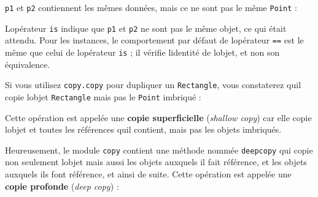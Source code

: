 \texttt{p1} et \texttt{p2} contiennent les mêmes données, mais ce ne
sont pas le même \texttt{Point} :

\begin{Shaded}
\begin{Highlighting}[]
\OperatorTok{\textgreater{}\textgreater{}\textgreater{}}
\NormalTok{(}\NormalTok{, }\NormalTok{)}
\OperatorTok{\textgreater{}\textgreater{}\textgreater{}}
\NormalTok{(}\NormalTok{, }\NormalTok{)}
\OperatorTok{\textgreater{}\textgreater{}\textgreater{}}
\OperatorTok{\textgreater{}\textgreater{}\textgreater{}}\OperatorTok{==}
\end{Highlighting}
\end{Shaded}

L\textquotesingle opérateur \texttt{is} indique que \texttt{p1} et
\texttt{p2} ne sont pas le même objet, ce qui était attendu. Pour les
instances, le comportement par défaut de l\textquotesingle opérateur
\texttt{==} est le même que celui de l\textquotesingle opérateur
\texttt{is} ; il vérifie l\textquotesingle identité de
l\textquotesingle objet, et non son équivalence.

Si vous utilisez \texttt{copy.copy} pour dupliquer un
\texttt{Rectangle}, vous constaterez qu\textquotesingle il copie
l\textquotesingle objet \texttt{Rectangle} mais pas le \texttt{Point}
imbriqué :

\begin{Shaded}
\begin{Highlighting}[]
\OperatorTok{\textgreater{}\textgreater{}\textgreater{}}\OperatorTok{=}
\OperatorTok{\textgreater{}\textgreater{}\textgreater{}}
\OperatorTok{\textgreater{}\textgreater{}\textgreater{}}
\end{Highlighting}
\end{Shaded}

Cette opération est appelée une \textbf{copie superficielle}
(\emph{shallow copy}) car elle copie l\textquotesingle objet et toutes
les références qu\textquotesingle il contient, mais pas les objets
imbriqués.

Heureusement, le module \texttt{copy} contient une méthode nommée
\texttt{deepcopy} qui copie non seulement l\textquotesingle objet mais
aussi les objets auxquels il fait référence, et les objets auxquels ils
font référence, et ainsi de suite. Cette opération est appelée une
\textbf{copie profonde} (\emph{deep copy}) :

